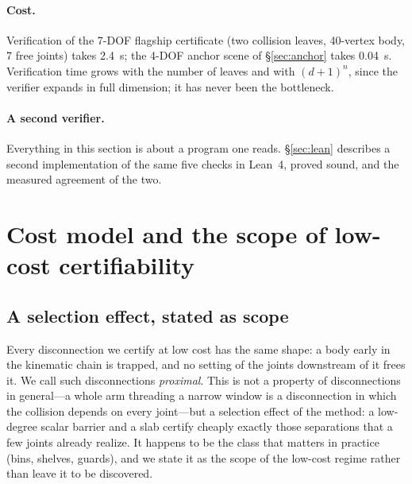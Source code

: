 \documentclass[10pt,twocolumn,letterpaper]{article}
\newif\ifhl \hlfalse  %
\newcommand{\new}[1]{\ifhl{\color{blue!65!black}#1}\else#1\fi}
\begin{document}
\paragraph{Cost.} Verification of the 7-DOF flagship certificate (two collision leaves, 40-vertex body, 7 free joints) takes 2.4~s; the 4-DOF anchor scene of \S\ref{sec:anchor} takes 0.04~s. Verification time grows with the number of leaves and with $(d+1)^n$, since the verifier expands in full dimension; it has never been the bottleneck.

\paragraph{A second verifier.} \new{Everything in this section is about a program one reads. \S\ref{sec:lean} describes a second implementation of the same five checks in Lean~4, proved sound, and the measured agreement of the two.}



\section{Cost model and the scope of low-cost certifiability}\label{sec:scope}

\subsection{A selection effect, stated as scope}
Every disconnection we certify at low cost has the same shape: a body early in the kinematic chain is trapped, and no setting of the joints downstream of it frees it. We call such disconnections \emph{proximal}. This is not a property of disconnections in general---a whole arm threading a narrow window is a disconnection in which the collision depends on every joint---but a selection effect of the method: a low-degree scalar barrier and a slab certify cheaply exactly those separations that a few joints already realize. It happens to be the class that matters in practice (bins, shelves, guards), and we state it as the scope of the low-cost regime rather than leave it to be discovered.
\end{document}

